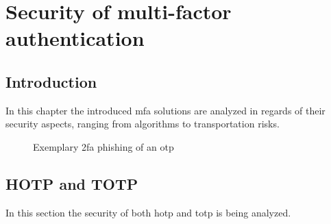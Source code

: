 \chapter{Security of multi-factor authentication}

\section{Introduction}

In this chapter the introduced \gls{mfa} solutions are analyzed in regards of their security aspects, ranging from algorithms to transportation risks.

\begin{figure}[hbt]
	\centering
	
	\caption[Exemplary \gls{mfa} phishing of an \gls{otp}]{Exemplary \gls{2fa} phishing of an \gls{otp}\footnotemark}
	\label{fig:2fa_flow_phishing}
\end{figure}


\section{HOTP and TOTP}

In this section the security of both \gls{hotp} and \gls{totp} is being analyzed.


